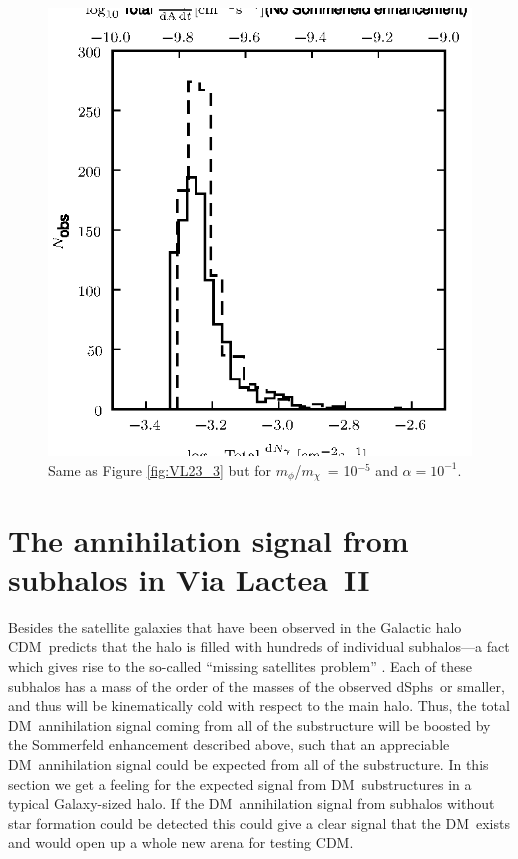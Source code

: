 \documentclass[aps,prd,twocolumn,amsmath,amssymb,floatfix,nofootinbib,10pt]{revtex4}
\newcommand{\VL}{Via Lactea}
\newcommand{\CDM}{CDM}
\newcommand{\DM}{DM}
\newcommand{\mdm}{\ensuremath{m_{\chi}}}
\newcommand{\mv}{\ensuremath{m_{\phi}}}
\newcommand{\dSphs}{dSphs}
\begin{document}
\begin{figure}
\centering
\includegraphics{hist_-5_-1_10_3.eps}
\caption{Same as Figure \ref{fig:VL23_3} but for \mv/\mdm\ = 10$^{-5}$
and $\alpha = 10^{-1}$.}%
\label{fig:VL51_2}%
\end{figure}










\section{The annihilation signal from subhalos in \VL\ II}

Besides the satellite galaxies that have been observed in the Galactic
halo \CDM\ predicts that the halo is filled with hundreds of
individual subhalos---a fact which gives rise to the so-called
``missing satellites problem''
\cite{1999ApJ...522...82K,1999ApJ...524L..19M}. Each of these subhalos
has a mass of the order of the masses of the observed \dSphs\ or
smaller, and thus will be kinematically cold with respect to the main
halo. Thus, the total \DM\ annihilation signal coming from all of the
substructure will be boosted by the Sommerfeld enhancement described
above, such that an appreciable \DM\ annihilation signal could be
expected from all of the substructure. In this section we get a
feeling for the expected signal from \DM\ substructures in a typical
Galaxy-sized halo. If the \DM\ annihilation signal from subhalos
without star formation could be detected this could give a clear
signal that the \DM\ exists and would open up a whole new arena for
testing \CDM.
\end{document}
